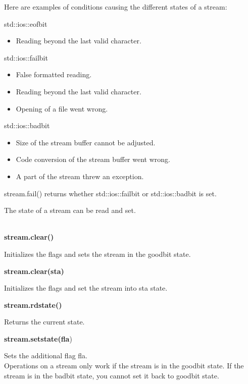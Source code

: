 Here are examples of conditions causing the different states of a stream:


std::ios::eofbit

\begin{itemize}
\item 
Reading beyond the last valid character.
\end{itemize}

std::ios::failbit

\begin{itemize}
\item 
False formatted reading.

\item 
Reading beyond the last valid character.

\item 
Opening of a file went wrong.
\end{itemize}

std::ios::badbit

\begin{itemize}
\item 
Size of the stream buffer cannot be adjusted.

\item 
Code conversion of the stream buffer went wrong.

\item 
A part of the stream threw an exception.
\end{itemize}

stream.fail() returns whether std::ios::failbit or std::ios::badbit is set.

The state of a stream can be read and set.

\noindent
\\\textbf{stream.clear()}

Initializes the flags and sets the stream in the goodbit state.

\noindent
\textbf{stream.clear(sta)}

Initializes the flags and set the stream into sta state.

\noindent
\textbf{stream.rdstate()}

Returns the current state.

\noindent
\textbf{stream.setstate(fla})

Sets the additional flag fla.\\

Operations on a stream only work if the stream is in the goodbit state. If the stream is in the badbit state, you cannot set it back to goodbit state.

